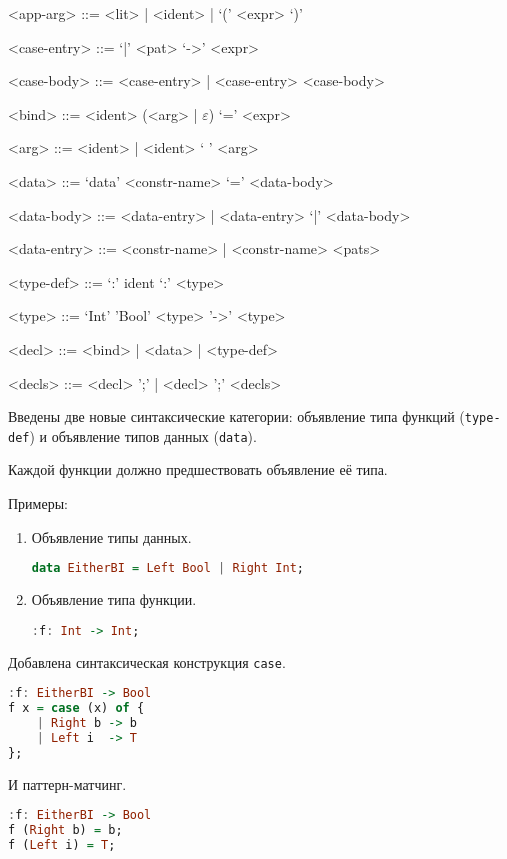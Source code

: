 \documentclass[12pt, a4paper] {ncc}
\begin{document}
\begin{grammar}
<app-arg> ::= <lit> | <ident> | `(' <expr> `)'

<case-entry> ::= `|' <pat> `->' <expr> 

<case-body> ::= <case-entry> | <case-entry> <case-body>

<bind> ::= <ident> (<arg> | $\varepsilon$) `=' <expr>

<arg> ::= <ident> | <ident> ` ' <arg>

<data> ::= `data' <constr-name> `=' <data-body>

<data-body> ::= <data-entry> | <data-entry> `|' <data-body>

<data-entry> ::= <constr-name> | <constr-name> <pats>

<type-def> ::= `:' ident `:' <type>

<type> ::= `Int'
\alt 'Bool'
\alt <type> '->' <type>

<decl> ::= <bind> | <data> | <type-def>

<decls> ::= <decl> ';' | <decl> ';' <decls>

\end{grammar}

Введены две новые синтаксические категории: объявление типа функций (\texttt{type-def})
и объявление типов данных (\texttt{data}).

Каждой функции должно предшествовать объявление её типа.

Примеры:
\begin{enumerate}
\item Объявление типы данных.
\begin{lstlisting}[language=Haskell]
data EitherBI = Left Bool | Right Int;
\end{lstlisting}

\item Объявление типа функции.
\begin{lstlisting}[language=Haskell]
:f: Int -> Int;
\end{lstlisting}
\end{enumerate}

Добавлена синтаксическая конструкция \texttt{case}.
\begin{lstlisting}[language=Haskell]
:f: EitherBI -> Bool
f x = case (x) of {
    | Right b -> b
    | Left i  -> T
};
\end{lstlisting}

И паттерн-матчинг.
\begin{lstlisting}[language=Haskell]
:f: EitherBI -> Bool
f (Right b) = b;
f (Left i) = T;
\end{lstlisting}
\end{document}
